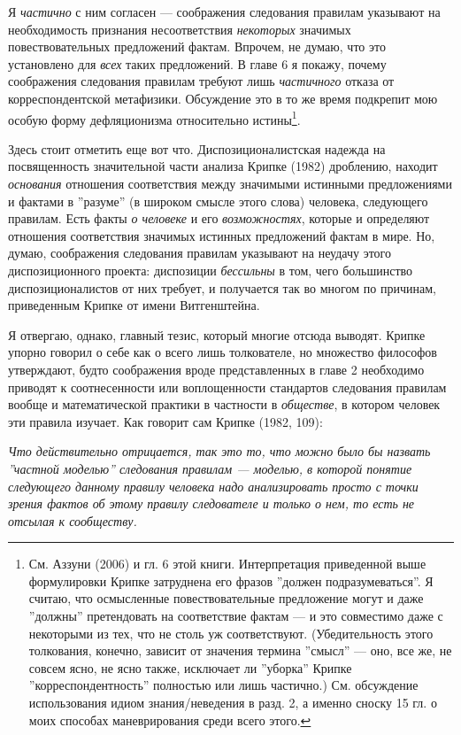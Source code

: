 \documentclass[11pt]{book}
\begin{document}
\smallskip

Я \textit{частично} с ним согласен --- соображения следования правилам указывают на необходимость признания несоответствия \textit{некоторых} значимых повествовательных предложений фактам. Впрочем, не думаю, что это установлено для \textit{всех} таких предложений. В главе 6 я покажу, почему соображения следования правилам требуют лишь \textit{частичного} отказа от корреспондентской метафизики. Обсуждение это в то же время подкрепит мою особую форму дефляционизма относительно истины\footnote{См. Аззуни (2006) и гл. 6 этой книги. Интерпретация приведенной выше формулировки Крипке затруднена его фразов ''должен подразумеваться''. Я считаю, что осмысленные повествовательные предложение могут и даже ''должны'' претендовать на соответствие фактам --- и это совместимо даже с некоторыми из тех, что не столь уж соответствуют. (Убедительность этого толкования, конечно, зависит от значения термина ''смысл'' --- оно, все же, не совсем ясно, не ясно также, исключает ли ''уборка'' Крипке ''корреспондентность'' полностью или лишь частично.) См. обсуждение использования идиом знания/неведения в разд. 2, а именно сноску 15 гл. о моих способах маневрирования среди всего этого.}.

Здесь стоит отметить еще вот что. Диспозиционалистская надежда на посвященность значительной части анализа Крипке (1982) дроблению, находит \textit{основания} отношения соответствия между значимыми истинными предложениями и фактами в ''разуме'' (в широком смысле этого слова) человека, следующего правилам. Есть факты \textit{о человеке} и его \textit{возможностях}, которые и определяют отношения соответствия значимых истинных предложений фактам в мире. Но, думаю, соображения следования правилам указывают на неудачу этого диспозиционного проекта: диспозиции \textit{бессильны} в том, чего большинство диспозиционалистов от них требует, и получается так во многом по причинам, приведенным Крипке от имени Витгенштейна.

Я отвергаю, однако, главный тезис, который многие отсюда выводят. Крипке упорно говорил о себе как о всего лишь толкователе, но множество философов утверждают, будто соображения вроде представленных в главе 2 необходимо приводят к соотнесенности или воплощенности стандартов следования правилам вообще и математической практики в частности в \textit{обществе}, в котором человек эти правила изучает. Как говорит сам Крипке (1982, 109):

\smallskip

\textit{Что действительно отрицается, так это то, что можно было бы назвать ''частной моделью'' следования правилам --- моделью, в которой понятие следующего данному правилу человека надо анализировать просто с точки зрения фактов об этому правилу следователе и только о нем, то есть не отсылая к сообществу.}
\end{document}
